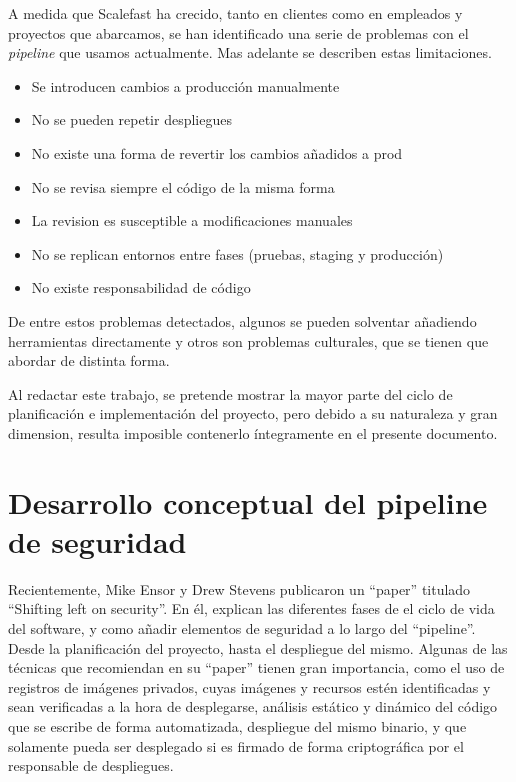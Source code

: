 \documentclass[12pt]{report} %
\begin{document}
A medida que Scalefast ha crecido, tanto en clientes como en empleados y 
proyectos que abarcamos, se han identificado una serie de problemas con 
el \textit{\gls{pipeline}} que usamos actualmente.
Mas adelante se describen estas limitaciones.

\begin{itemize}
  \item{Se introducen cambios a producción manualmente}
  \item{No se pueden repetir despliegues}
  \item{No existe una forma de revertir los cambios añadidos a prod}
  \item{No se revisa siempre el código de la misma forma}
  \item{La revision es susceptible a modificaciones manuales}
  \item{No se replican entornos entre fases (pruebas, \gls{staging} y producción)}
  \item{No existe responsabilidad de código}
\end{itemize}

De entre estos problemas detectados, algunos se pueden solventar añadiendo
herramientas directamente y otros son problemas culturales, que se tienen que
abordar de distinta forma.

Al redactar este trabajo, se pretende mostrar la mayor parte del ciclo de
planificación e implementación del proyecto, pero debido a su naturaleza y gran
dimension, resulta imposible contenerlo íntegramente en el presente documento.

\section{Desarrollo conceptual del pipeline de seguridad}

Recientemente, Mike Ensor y Drew Stevens publicaron un ``paper'' titulado
``Shifting left on security''.  En él, explican las diferentes fases de el ciclo
de vida del software, y como añadir elementos de seguridad a lo largo del
``pipeline''. 
Desde la planificación del proyecto, hasta el despliegue del mismo.
Algunas de las técnicas que recomiendan en su ``paper'' tienen gran
importancia, como el uso de registros de imágenes privados, cuyas imágenes y 
recursos estén identificadas y sean verificadas a la hora de desplegarse,
análisis estático y dinámico del código que se escribe de forma automatizada,
despliegue del mismo binario, y que solamente pueda ser desplegado si es firmado
de forma criptográfica por el responsable de despliegues.\cite{Ensor2021}
\end{document}
